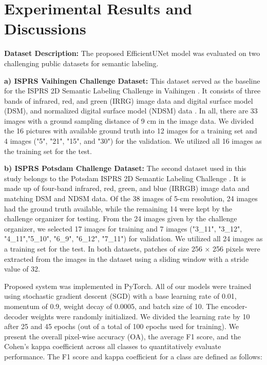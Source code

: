 \documentclass[journal]{IEEEtran}
\begin{document}
\section{Experimental Results and Discussions} 
\textbf{Dataset Description:} The proposed EfficientUNet model was evaluated on two challenging public datasets for semantic labeling.

\textbf{a)	ISPRS Vaihingen Challenge Dataset:} This dataset served as the baseline for the ISPRS 2D Semantic Labeling Challenge in Vaihingen \cite{labeling_2016}. It consists of three bands of infrared, red, and green (IRRG) image data and digital surface model (DSM), and normalized digital surface model (NDSM) data \cite{Gerke2014UseOT}. In all, there are 33 images with a ground sampling distance of 9 cm in the image data. We divided the 16 pictures with available ground truth into 12 images for a training set and 4 images ("5", "21", "15", and "30") for the validation. We utilized all 16 images as the training set for the test.

\textbf{b) ISPRS Potsdam Challenge Dataset:} The second dataset used in this study belongs to the Potsdam ISPRS 2D Semantic Labeling Challenge \cite{labeling_2016}. It is made up of four-band infrared, red, green, and blue (IRRGB) image data and matching DSM and NDSM data. Of the 38 images of 5{-}cm resolution, 24 images had the ground truth available, while the remaining 14 were kept by the challenge organizer for testing. From the 24 images given by the challenge organizer, we selected 17 images for training and 7 images ({"}3{\_}11{"}, {"}3{\_}12{"}, {"}4{\_}11{"},{"}5{\_}10{"}, {"}6{\_}9{"}, {"}6{\_}12{"}, {"}7{\_}11{"}) for validation. We utilized all 24 images as a training set for the test. 
In both datasets, patches of size 256 × 256 pixels were extracted from the images in the dataset using a sliding window with a stride value of 32.  

Proposed system was implemented in PyTorch. All of our models were trained using stochastic gradient descent (SGD) with a base learning rate of 0.01, momentum of 0.9, weight decay of 0.0005, and batch size of 10. The encoder-decoder weights were randomly initialized. We divided the learning rate by 10 after 25 and 45 epochs (out of a total of 100 epochs used for training). 
We present the overall pixel-wise accuracy (OA), the average F1 score, and the Cohen's kappa coefficient  across all classes to quantitatively evaluate performance. The F1 score and kappa coefficient  for a class   are defined as follows:
\end{document}
